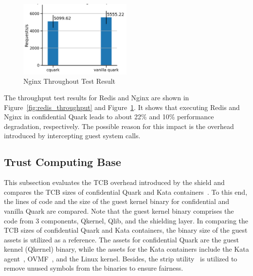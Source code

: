 \begin{figure}[!htb]
  \centering
  \includegraphics[width=0.5\textwidth]{images/nginx_throughput.PNG}
  \caption[Nginx Throughout Test]{Nginx Throughout Test Result}
  \label{fig:nginx_throughput}
\end{figure}

The throughput test results for Redis and Nginx are shown in Figure~\ref{fig:redis_throughput} and Figure~\ref{fig:nginx_throughput}. It shows that executing Redis and Nginx in confidential Quark leads to about 22\% and 10\% performance degradation, respectively. 
The possible reason for this impact is the overhead introduced by intercepting guest system calls.


\subsection{Trust Computing Base}\label{tcb}

This subsection evaluates the \acrshort{TCB} overhead introduced by the shield and compares the \acrshort{TCB}  sizes of confidential Quark and Kata containers~\cite*{Kata-Containers}. To this end, the lines of code and the size of the guest kernel binary for confidential and 
vanilla Quark are compared. Note that the guest kernel binary comprises the code from 3 components, Qkernel, Qlib, and the shielding layer. In comparing the \acrshort{TCB} sizes of confidential Quark and Kata containers, the binary size of the guest assets is utilized as a reference. The assets for 
confidential Quark are the guest kennel (Qkernel) binary, while the assets for the Kata containers include the Kata agent~\cite*{kata_agent}, OVMF~\cite*{ovmf}, and the Linux kernel. Besides, the strip utility~\cite*{strip} is utilized to remove unused symbols from the binaries to ensure fairness.

